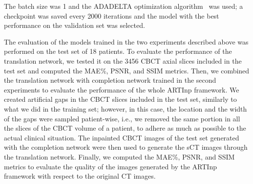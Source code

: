 The batch size was 1 and the ADADELTA optimization algorithm~\cite{zeiler2012adadelta} was used; a checkpoint was saved every 2000 iterations and the model with the best performance on the validation set was selected.

The evaluation of the models trained in the two experiments described above was performed on the test set of 18 patients.
To evaluate the performance of the translation network, we tested it on the 3456 CBCT axial slices included in the test set and computed the MAE\%, PSNR, and SSIM metrics.
Then, we combined the translation network with completion network trained in the second experiments to evaluate the performance of the whole ARTInp framework.
We created artificial gaps in the CBCT slices included in the test set, similarly to what we did in the training set; however, in this case, the location and the width of the gaps were sampled patient-wise, i.e., we removed the same portion in all the slices of the CBCT volume of a patient, to adhere as much as possible to the actual clinical situation.
The inpainted CBCT images of the test set generated with the completion network were then used to generate the sCT images through the translation network.
Finally, we computed the MAE\%, PSNR, and SSIM metrics to evaluate the quality of the images generated by the ARTInp framework with respect to the original CT images.

